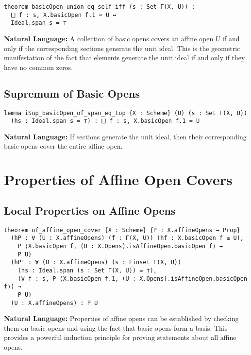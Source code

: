 \documentclass{article}
\theoremstyle{definition}
\begin{document}
\begin{lstlisting}
theorem basicOpen_union_eq_self_iff (s : Set Γ(X, U)) :
  ⨆ f : s, X.basicOpen f.1 = U ↔
  Ideal.span s = ⊤
\end{lstlisting}

\textbf{Natural Language:} A collection of basic opens covers an affine open $U$ if and only if the corresponding sections generate the unit ideal. This is the geometric manifestation of the fact that elements generate the unit ideal if and only if they have no common zeros.

\subsection{Supremum of Basic Opens}

\begin{lstlisting}
lemma iSup_basicOpen_of_span_eq_top {X : Scheme} (U) (s : Set Γ(X, U))
  (hs : Ideal.span s = ⊤) : ⨆ f : s, X.basicOpen f.1 = U
\end{lstlisting}

\textbf{Natural Language:} If sections generate the unit ideal, then their corresponding basic opens cover the entire affine open.

\section{Properties of Affine Open Covers}

\subsection{Local Properties on Affine Opens}

\begin{lstlisting}
theorem of_affine_open_cover {X : Scheme} {P : X.affineOpens → Prop}
  (hP : ∀ (U : X.affineOpens) (f : Γ(X, U)) (hf : X.basicOpen f ≤ U),
    P ⟨X.basicOpen f, (U : X.Opens).isAffineOpen.basicOpen f⟩ →
    P U)
  (hP' : ∀ (U : X.affineOpens) (s : Finset Γ(X, U))
    (hs : Ideal.span (s : Set Γ(X, U)) = ⊤),
    (∀ f : s, P ⟨X.basicOpen f.1, (U : X.Opens).isAffineOpen.basicOpen f⟩) →
    P U)
  (U : X.affineOpens) : P U
\end{lstlisting}

\textbf{Natural Language:} Properties of affine opens can be established by checking them on basic opens and using the fact that basic opens form a basis. This provides a powerful induction principle for proving statements about all affine opens.
\end{document}
